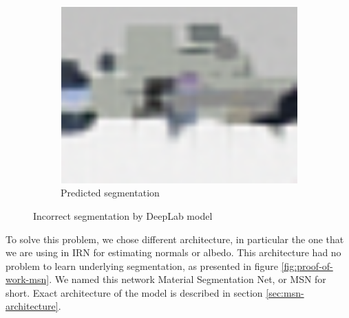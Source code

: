 \begin{figure}[H]
\begin{subfigure}{0.32\linewidth}
    \includegraphics[width=\linewidth]{praca/images/DeepLab-segmentation.png}
    \caption{Predicted segmentation}
  \end{subfigure}
  \caption[Incorrect segmentation by DeepLab model]{Incorrect segmentation by DeepLab model}
  \label{fig:deeplab-segmentation}
\end{figure}
\noindent To solve this problem, we chose different architecture, in particular the one that we are using in IRN for estimating normals or albedo. This architecture had no problem to learn underlying segmentation, as presented in figure \ref{fig:proof-of-work-msn}. We named this network Material Segmentation Net, or MSN for short. Exact architecture of the model is described in section \ref{sec:msn-architecture}.
